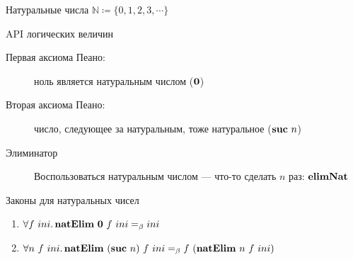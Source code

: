     \begin{frame}[fragile]{Натуральные числа $\mathbb{N} \coloneqq \{0, 1, 2, 3, \cdots\}$}
        \pause
        \begin{block}{API логических величин}
            \begin{description}
                \item[Первая аксиома Пеано:] ноль является натуральным числом ($\mathbf{0}$)
                \item[Вторая аксиома Пеано:] число, следующее за натуральным, тоже
                натуральное ($\mathbf{suc} ~ n$)
                \item[Элиминатор] Воспользоваться натуральным числом --- что-то сделать $n$ раз: $\mathbf{elimNat}$
            \end{description}
        \end{block}
        \pause
        \begin{block}{Законы для натуральных чисел}
            \begin{enumerate}
                \item $\forall f~ini\ldotp \mathbf{natElim} ~ \mathbf{0} ~ f ~ ini =_\beta ini$
                \item $\forall n~f~ini\ldotp \mathbf{natElim} ~ (\mathbf{suc} ~ n) ~ f ~ ini =_\beta f ~ (\mathbf{natElim} ~ n ~ f ~ ini)$
            \end{enumerate}
        \end{block}
    \end{frame}


